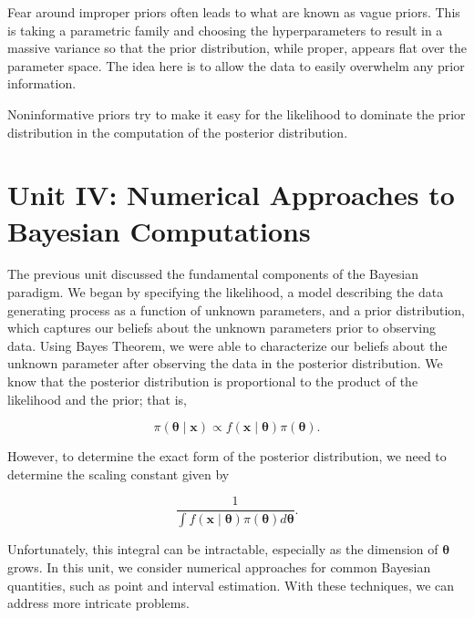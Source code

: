 \documentclass[
  letterpaper,
  DIV=11,
  numbers=noendperiod]{scrreprt}
\theoremstyle{definition}
\theoremstyle{plain}
\theoremstyle{definition}
\theoremstyle{remark}
\begin{document}
Fear around improper priors often leads to what are known as vague
priors. This is taking a parametric family and choosing the
hyperparameters to result in a massive variance so that the prior
distribution, while proper, appears flat over the parameter space. The
idea here is to allow the data to easily overwhelm any prior
information.

\begin{tcolorbox}[enhanced jigsaw, rightrule=.15mm, colbacktitle=quarto-callout-tip-color!10!white, bottomrule=.15mm, colback=white, opacityback=0, breakable, coltitle=black, titlerule=0mm, colframe=quarto-callout-tip-color-frame, title=\textcolor{quarto-callout-tip-color}{\faLightbulb}\hspace{0.5em}{Big Idea}, opacitybacktitle=0.6, left=2mm, toprule=.15mm, toptitle=1mm, bottomtitle=1mm, leftrule=.75mm, arc=.35mm]

Noninformative priors try to make it easy for the likelihood to dominate
the prior distribution in the computation of the posterior distribution.

\end{tcolorbox}

\part{Unit IV: Numerical Approaches to Bayesian Computations}

The previous unit discussed the fundamental components of the Bayesian
paradigm. We began by specifying the likelihood, a model describing the
data generating process as a function of unknown parameters, and a prior
distribution, which captures our beliefs about the unknown parameters
prior to observing data. Using Bayes Theorem, we were able to
characterize our beliefs about the unknown parameter after observing the
data in the posterior distribution. We know that the posterior
distribution is proportional to the product of the likelihood and the
prior; that is,

\[\pi(\boldsymbol{\theta} \mid \mathbf{x}) \propto f(\mathbf{x} \mid \boldsymbol{\theta}) \pi(\boldsymbol{\theta}).\]

However, to determine the exact form of the posterior distribution, we
need to determine the scaling constant given by

\[\frac{1}{\int f(\mathbf{x} \mid \boldsymbol{\theta}) \pi(\boldsymbol{\theta}) d\boldsymbol{\theta}}.\]

Unfortunately, this integral can be intractable, especially as the
dimension of \(\boldsymbol{\theta}\) grows. In this unit, we consider
numerical approaches for common Bayesian quantities, such as point and
interval estimation. With these techniques, we can address more
intricate problems.
\end{document}
